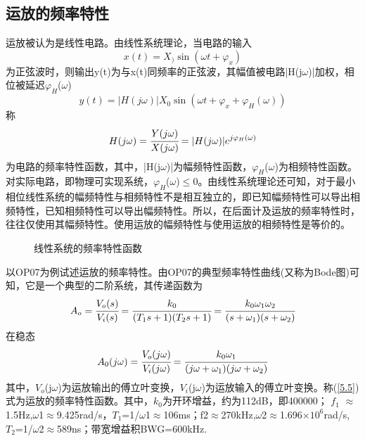 \documentclass[a4paper]{article}
\begin{document}
\subsection{运放的频率特性}
运放被认为是线性电路。由线性系统理论，当电路的输入
\begin{equation}
x(t) = X_)\sin(\omega t+\varphi_x)\label{5.1}
\end{equation}
为正弦波时，则输出y(t)为与x(t)同频率的正弦波，其幅值被电路|H(j$\omega$)|加权，相位被延迟$\varphi_H$($\omega$)
\begin{equation}
y(t) = |H(j\omega)|X_0\sin\left(\omega t+\varphi_x+\varphi_H(\omega)\right)\label{5.2}
\end{equation}
称
\begin{equation}
H(j\omega) = \cfrac{Y(j\omega)}{X(j\omega)} = |H(j\omega)|e^{j\varphi_H(\omega)}\label{5.3}
\end{equation}
为电路的频率特性函数，其中，|H(j$\omega$)|为幅频特性函数，$\varphi_H$($\omega$)为相频特性函数。对实际电路，即物理可实现系统，$\varphi_H$($\omega$)$\leq 0$。由线性系统理论还可知，对于最小相位线性系统的幅频特性与相频特性不是相互独立的，即已知幅频特性可以导出相频特性，已知相频特性可以导出幅频特性。所以，在后面计及运放的频率特性时，往往仅使用其幅频特性。使用运放的幅频特性与使用运放的相频特性是等价的。
\begin{figure}[!h]
\centering
{}
\caption{线性系统的频率特性函数}\label{freqFuncLinSys}
\end{figure}
以OP07为例试述运放的频率特性。由OP07的典型频率特性曲线(又称为Bode图)可知，它是一个典型的二阶系统，其传递函数为
\begin{equation}
A_o = \cfrac{V_o(s)}{V_i(s)} = \cfrac{k_0}{(T_1s+1)(T_2s+1)} = \cfrac{k_0\omega_1\omega_2}{(s+\omega_1)(s+\omega_2)}\label{5.4}
\end{equation}
在稳态
\begin{equation}
A_0(j\omega) = \cfrac{V_o(j\omega)}{V_i(j\omega)} = \cfrac{k_0\omega_1}{(j\omega+\omega_1)(j\omega+\omega_2)}\label{5.5}
\end{equation}
其中，$V_o$(j$\omega$)为运放输出的傅立叶变换，$V_i$(j$\omega$)为运放输入的傅立叶变换。称(\ref{5.5})式为运放的频率特性函数。其中，$k_0$为开环增益，约为112dB，即400000； $f_1$ $\approx$1.5Hz,$\omega$1$\approx$9.425rad/s，$T_1$=1/$\omega$1$\approx$106ms；f2$\approx$270kHz,$\omega$2$\approx$1.696$\times 10^6$rad/s, $T_2$=1/$\omega$2$\approx$589ns；带宽增益积BWG=600kHz.
\end{document}
